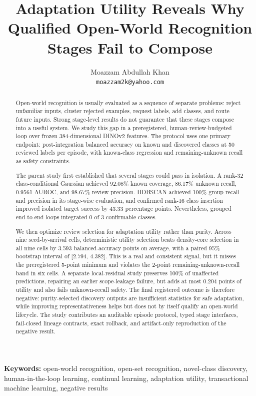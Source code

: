 \documentclass[10pt]{article}
\title{Adaptation Utility Reveals Why Qualified Open-World Recognition
Stages Fail to Compose}
\author{
  Moazzam Abdullah Khan\\
  \texttt{moazzam2k@yahoo.com}
}
\date{}
\begin{document}
\maketitle

\begin{abstract}
Open-world recognition is usually evaluated as a sequence of separate
problems: reject unfamiliar inputs, cluster rejected examples, request labels,
add classes, and route future inputs. Strong stage-level results do not
guarantee that these stages compose into a useful system. We study this gap in
a preregistered, human-review-budgeted loop over frozen 384-dimensional DINOv2
features. The protocol uses one primary endpoint: post-integration balanced
accuracy on known and discovered classes at 50 reviewed labels per episode,
with known-class regression and remaining-unknown recall as safety constraints.

The parent study first established that several stages could pass in
isolation. A rank-32 class-conditional Gaussian achieved 92.08\% known
coverage, 86.17\% unknown recall, 0.9561 AUROC, and 98.67\% review precision.
HDBSCAN achieved 100\% group recall and precision in its stage-wise
evaluation, and confirmed rank-16 class insertion improved isolated target
success by 43.33 percentage points. Nevertheless, grouped end-to-end loops
integrated 0 of 3 confirmable classes.

We then optimize review selection for adaptation utility rather than purity.
Across nine seed-by-arrival cells, deterministic utility selection beats
density-core selection in all nine cells by 3.593 balanced-accuracy points on
average, with a paired 95\% bootstrap interval of [2.794, 4.382]. This is a
real and consistent signal, but it misses the preregistered 5-point minimum and
violates the 2-point remaining-unknown-recall band in six cells. A separate
local-residual study preserves 100\% of unaffected predictions, repairing an
earlier scope-leakage failure, but adds at most 0.204 points of utility and
also fails unknown-recall safety. The final registered outcome is therefore
negative: purity-selected discovery outputs are insufficient statistics for
safe adaptation, while improving representativeness helps but does not by
itself qualify an open-world lifecycle. The study contributes an auditable
episode protocol, typed stage interfaces, fail-closed lineage contracts, exact
rollback, and artifact-only reproduction of the negative result.
\end{abstract}

\noindent\textbf{Keywords:} open-world recognition, open-set recognition,
novel-class discovery, human-in-the-loop learning, continual learning,
adaptation utility, transactional machine learning, negative results
\end{document}
